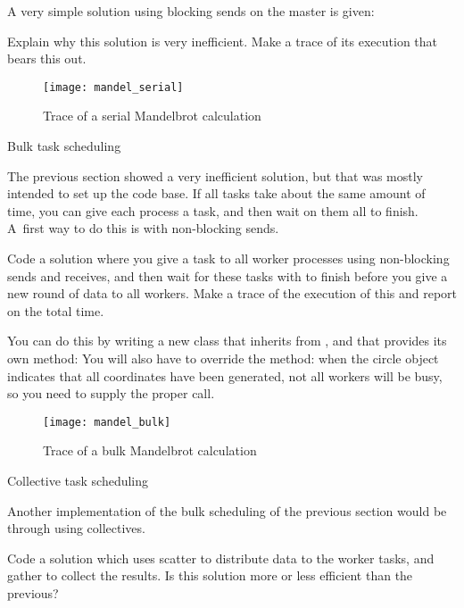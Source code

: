 A very simple solution using blocking sends on the master is given:

\begin{exercise}
  Explain why this solution is very inefficient. Make a trace of its
  execution that bears this out.
\end{exercise}

\begin{figure}[ht]
\texttt{[image: mandel\_serial]}
\caption{Trace of a serial Mandelbrot calculation}
\label{fig:mandel-serial}
\end{figure}

 {Bulk task scheduling}
\label{proj:mandel-bulk}

The previous section showed a very inefficient solution, but that was mostly
intended to set up the code base. If all tasks take about the same amount of time,
you can give each process a task, and then wait on them all to finish. A~first way
to do this is with non-blocking sends.

\begin{exercise}
  Code a  solution where you give a task to all worker processes
  using non-blocking sends and receives, and then wait for these tasks
  with 
  to finish before you give a new round of data to all workers.
  Make a trace of the execution of this and report on the total time.

  You can do this by writing a new class that inherits from ,
  and that provides its own  method:
  You will also have to override the  method: when the circle 
  object indicates that all coordinates have been generated, not all
  workers will be busy, so you need to supply the proper 
  call.
\end{exercise}

\begin{figure}[ht]
\texttt{[image: mandel\_bulk]}
\caption{Trace of a bulk Mandelbrot calculation}
\label{fig:mandel-bulk}
\end{figure}

 {Collective task scheduling}
\label{proj:mandel-collective}

Another implementation of the bulk scheduling of the previous section
would be through using collectives.

\begin{exercise}
  Code a solution which uses scatter to distribute data to the worker
  tasks, and gather to collect the results. Is this solution more or
  less efficient than the previous?
\end{exercise}

